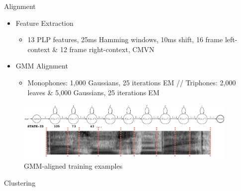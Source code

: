 \documentclass[final]{beamer} %
\newlength{\columnheight}
\begin{document}
\begin{frame}
\begin{columns}
\begin{column}{0.23\textwidth}
{        \vfill
        
      } %
    \end{column}

    \begin{column}{0.23\textwidth}

      \parbox[t][\columnheight]{.9\textwidth}{
                      \vspace{1cm}

        \begin{block}{\boxnumber Alignment}
          \begin{itemize}
          \item Feature Extraction
            \begin{itemize}
            \item 13 PLP features, 25ms Hamming windows, 10ms shift, 16 frame left-context \& 12 frame right-context, CMVN
            \end{itemize}
          \item GMM Alignment
            \begin{itemize}
            \item Monophones: 1,000 Gaussians, 25 iterations EM // Triphones: 2,000 leaves \& 5,000 Gaussians, 25 iterations EM
            \end{itemize}
          \end{itemize}
        \end{block}
  
        \vfill
        
        \begin{figure}[!htbp]
          \centering
          \includegraphics[width=\linewidth]{figs/aligned.png}
          \caption{GMM-aligned training examples}
          \endminipage\hfill
        \end{figure}
        
        \vfill
        
        \begin{block}{\boxnumber Clustering}
                    

\end{block}}
\end{column}
\end{columns}
\end{frame}
\end{document}
